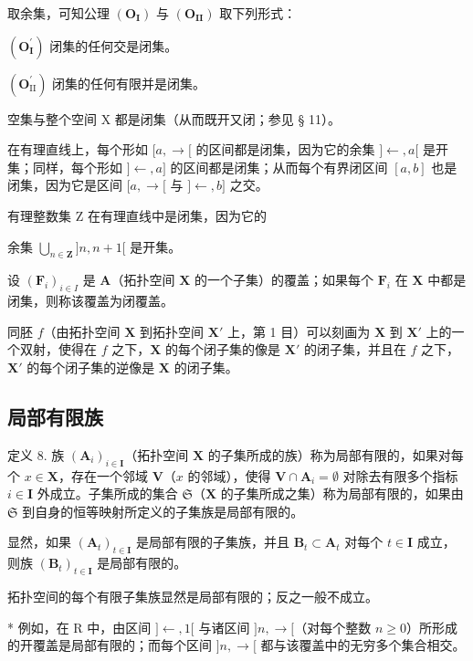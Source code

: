 取余集，可知公理 \((\mathbf{O}_{\mathbf{I}})\) 与 \((\mathbf{O}_{\mathbf{II}})\) 取下列形式：

\((\mathbf{O}_{\mathbf{I}}^{\prime})\) 闭集的任何交是闭集。

\((\mathbf{O}_{\mathrm{II}}^{\prime})\) 闭集的任何有限并是闭集。

空集与整个空间 X 都是闭集（从而既开又闭；参见 § 11）。

在有理直线上，每个形如 \([a, \rightarrow[\) 的区间都是闭集，因为它的余集 \(]\leftarrow, a[\) 是开集；同样，每个形如 \(]\leftarrow, a]\) 的区间都是闭集；从而每个有界闭区间 \([a, b]\) 也是闭集，因为它是区间 \([a, \rightarrow[\) 与 \(]\leftarrow, b]\) 之交。

有理整数集 Z 在有理直线中是闭集，因为它的

余集 \(\bigcup_{n\in \mathbf{Z}}]n,n + 1[\) 是开集。

设 \((\mathbf{F}_i)_{i\in I}\) 是 \(\mathbf{A}\)（拓扑空间 \(\mathbf{X}\) 的一个子集）的覆盖；如果每个 \(\mathbf{F}_i\) 在 \(\mathbf{X}\) 中都是闭集，则称该覆盖为闭覆盖。

同胚 \(f\)（由拓扑空间 \(\mathbf{X}\) 到拓扑空间 \(\mathbf{X}'\) 上，第 1 目）可以刻画为 \(\mathbf{X}\) 到 \(\mathbf{X}'\) 上的一个双射，使得在 \(f\) 之下，\(\mathbf{X}\) 的每个闭子集的像是 \(\mathbf{X}'\) 的闭子集，并且在 \(f\) 之下，\(\mathbf{X}'\) 的每个闭子集的逆像是 \(\mathbf{X}\) 的闭子集。

\subsection{局部有限族}

定义 8. 族 \((\mathbf{A}_{i})_{i\in \mathbf{I}}\)（拓扑空间 \(\mathbf{X}\) 的子集所成的族）称为局部有限的，如果对每个 \(x\in \mathbf{X}\)，存在一个邻域 \(\mathbf{V}\)（\(x\) 的邻域），使得 \(\mathbf{V}\cap \mathbf{A}_i = \emptyset\) 对除去有限多个指标 \(i\in \mathbf{I}\) 外成立。子集所成的集合 \(\mathfrak{S}\)（\(\mathbf{X}\) 的子集所成之集）称为局部有限的，如果由 \(\mathfrak{S}\) 到自身的恒等映射所定义的子集族是局部有限的。

显然，如果 \((\mathbf{A}_t)_{t \in \mathbf{I}}\) 是局部有限的子集族，并且 \(\mathbf{B}_t \subset \mathbf{A}_t\) 对每个 \(t \in \mathbf{I}\) 成立，则族 \((\mathbf{B}_t)_{t \in \mathbf{I}}\) 是局部有限的。

拓扑空间的每个有限子集族显然是局部有限的；反之一般不成立。

* 例如，在 R 中，由区间 \(]\leftarrow, 1[\) 与诸区间 \(]n, \rightarrow[\)（对每个整数 \(n\geqslant0\)）所形成的开覆盖是局部有限的；而每个区间 \(]n, \rightarrow[\) 都与该覆盖中的无穷多个集合相交。


